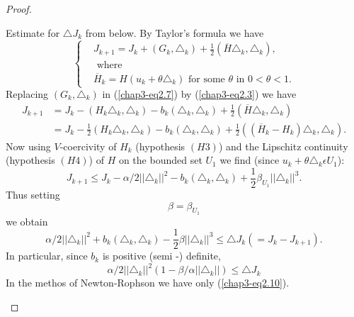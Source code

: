 \begin{proof}
\begin{step}%
 Estimate for $\triangle J_{k}$ from below. By Taylor's formula we have
\begin{equation*}
\begin{cases}
& J_{k+1} = J_{k} + (G_{k}, \triangle_{k}) + \frac{1}{2} (\overline{H} \triangle_{k}, \triangle_{k}),\\
& \text{ where }\\
& \overline{H}_{k} = H(u_{k} + \theta \triangle_{k}) \text{ for some } \theta \text{ in } 0 < \theta < 1.\tag{2.7}\label{chap3-eq2.7}
\end{cases}
\end{equation*}
Replacing $(G_{k}, \triangle_{k})$ in (\ref{chap3-eq2.7}) by (\ref{chap3-eq2.3}) we have
\begin{align*}
J_{k+1} & = J_{k} - (H_{k} \triangle_{k}, \triangle_{k}) - b_{k} (\triangle_{k}, \triangle_{k}) + \frac{1}{2} (\overline{H} \triangle_{k}, \triangle_{k})\\
& = J_{k} - \frac{1}{2} (H_{k} \triangle_{k}, \triangle_{k}) - b_{k} (\triangle_{k}, \triangle_{k}) + \frac{1}{2} ((\overline{H}_{k}-H_{k}) \triangle_{k}, \triangle_{k}).
\end{align*}
Now using $V$-coercivity of $H_{k}$ (hypothesis $(H3)$) and the Lipschitz continuity (hypothesis $(H4)$) of $H$ on the bounded set $U_{1}$ we find (since $u_{k} + \theta \triangle_{k} \epsilon U_{1}$):
$$
J_{k+1} \leq J_{k} - \alpha / 2 ||\triangle_{k}||^{2} - b_{k} (\triangle_{k}, \triangle_{k}) + \frac{1}{2} \beta_{U_{1}} ||\triangle_{k}||^{3}.
$$
Thus setting
\begin{equation*}
\beta = \beta_{U_{1}}\tag{2.8}\label{chap3-eq2.8}
\end{equation*}
we obtain
\begin{equation*}
\alpha / 2 ||\triangle_{k}||^{2} + b_{k} (\triangle_{k}, \triangle_{k}) - \frac{1}{2} \beta ||\triangle_{k}||^{3} \leq \triangle J_{k} (= J_{k} - J_{k+1}).\tag{2.9}\label{chap3-eq2.9}
\end{equation*}
In particular, since $b_{k}$ is positive (semi -) definite,
\begin{equation*}
\alpha / 2 ||\triangle_{k}||^{2} (1 - \beta / \alpha ||\triangle_{k}||) \leq \triangle J_{k}\tag{2.10}\label{chap3-eq2.10}
\end{equation*}\pageoriginale
In the methos of Newton-Rophson we have only (\ref{chap3-eq2.10}).
\end{step}


\end{proof}
